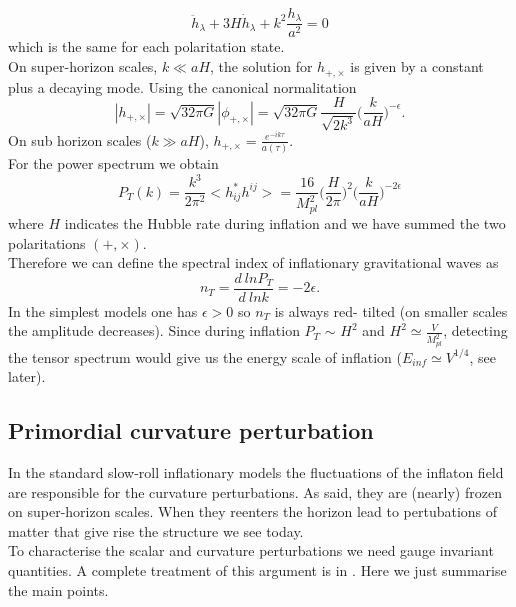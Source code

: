\documentclass[11pt,a4paper,twoside]{book}
\begin{document}
\begin{equation}
	\ddot{h}_{\lambda} + 3H\dot{h}_{\lambda}+ k^{2}\frac{h_{\lambda}}{a^{2}}=0
\end{equation}
which is the same for each polaritation state.\\
On super-horizon scales, $ k\ll aH $, the solution for $ h_{+,\times} $ is given by a constant plus a decaying mode. Using the canonical normalitation
\begin{equation}
|h_{+,\times}|= \sqrt{32\pi G}|\phi_{+,\times}| = \sqrt{32\pi G} \frac{H}{\sqrt{2k^{3}}}\Big (\frac{k}{aH}\Big)^{-\epsilon}.
\end{equation}
On sub horizon scales ($ k \gg aH $), $ h_{+,\times}=\frac{e^{-ik\tau}}{a(\tau)} $.\\
For the power spectrum we obtain
\begin{equation}
\label{spectumGW}
P_{T}(k)=\frac{k^{3}}{2\pi^{2}}<h^{*}_{ij}h^{ij}>=\frac{16}{M_{pl}^{2}}\Big(\frac{H}{2\pi}\Big )^{2}\Big (\frac{k}{aH}\Big)^{-2\epsilon}
\end{equation}   
where $ H $ indicates the Hubble rate during inflation and we have summed the two polaritations $ (+,\times) $.\\
Therefore we can define the spectral index of inflationary gravitational waves as
\begin{equation}
n_{T} = \frac{d\ ln P_{T}}{d\ ln k} = -2\epsilon.
\end{equation}
In the simplest models one has $ \epsilon > 0 $ so $ n_{T} $ is always red- tilted (on smaller scales the amplitude decreases).
Since during inflation $P_{T} $ $\sim$ $ H^{2} $ and $ H^{2} \simeq \frac{V}{M^{2}_{pl}} $, detecting the tensor spectrum would give us the energy scale of inflation ($ E_{inf} \simeq V^{1/4} $, see later). 

\subsection{Primordial curvature perturbation}
In the standard slow-roll inflationary models the fluctuations of the inflaton field are responsible for the curvature perturbations.
 As said, they are (nearly) frozen on super-horizon scales. When they reenters the horizon lead to pertubations of matter that give rise the structure we see today.\\
To characterise the scalar and curvature perturbations we need gauge invariant quantities.
A complete treatment of this argument is in \cite{NonGauss:Intro}. Here we just summarise the main points.
\end{document}
